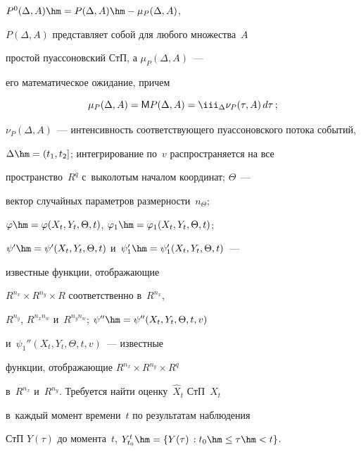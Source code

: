 $P^0(\Delta,A)\hm=P(\Delta,A)\hm-\mu_P (\Delta,A)$, 

$P(\Delta,A)$  представляет собой для любого множества~$A$ 

простой пуассоновский СтП, а $\mu_P (\Delta,A)$~--- 

его математическое ожидание, причем



\vspace*{2pt}



\noindent

    $$

    \mu_P (\Delta,A)=    {\sf M} P (\Delta,A)=\iii_\Delta \nu_P(\tau, A)\, d\tau\,;

    $$

    

    \vspace*{-2pt}

    

    \noindent

$\nu_P (\Delta, A)$~--- интенсивность соответствующего пуассоновского потока событий,\linebreak 

$\Delta \hm=(t_1,t_2]$; интегрирование по~$v$ распространяется на все 

пространство~$R^q$ с~выколотым началом координат; $\Theta$~--- 

вектор случайных параметров раз\-мер\-ности~$n_\Theta$;

$\varphi\hm=\varphi(X_t,Y_t,\Theta, t)$, $\varphi_1\hm=\varphi_1(X_t,Y_t,\Theta, t)$;

 $\psi'\hm=\psi'(X_t,Y_t,\Theta, t)$ и~$\psi_1'\hm=\psi_1'(X_t,Y_t,\Theta, t)$~--- 

 известные функции, отображающие

$R^{n_x}\times R^{n_y}\times  R$ соответственно в~$R^{n_x}$,

$R^{n_y}$, $R^{n_xn_w}$ и~$R^{n_yn_w}$; $\psi''\hm=\psi''(X_t,Y_t,\Theta, t,v)$ 

и~$\psi_1''(X_t,Y_t,\Theta, t,v)$~--- известные

функции, отображающие $R^{n_x}\times R^{n_y}\times R^q$ 

в~$R^{n_x}$ и~$R^{n_y}$. Требуется найти оценку~$\hat X_t$ СтП~$X_t$ 

в~каж\-дый момент времени~$t$ по результатам наблюдения

СтП $Y(\tau)$ до момента~$t$, $Y_{t_0}^t \hm = \{ Y(\tau) \,: t_0\hm \le \tau\hm< t\}$.



